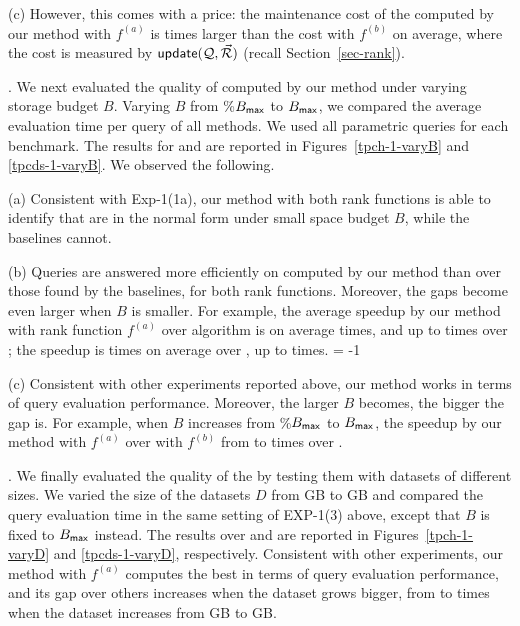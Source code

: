 \sstab (c) However, this comes with a price: the maintenance cost
of the \bdss computed by our method with $f^{(a)}$ is  times
larger than the cost with $f^{(b)}$ on average,
where the cost is measured by ${\mathsf{update}}(\mathcal Q, \vec{{\mathcal R}})$ (recall Section~\ref{sec-rank}). 


. We next evaluated the
quality of \bdss computed by our method under varying storage
budget $B$. Varying $B$ from \%$B_{\protect\mathsf{max}}$ to
$B_{\protect\mathsf{max}}$, we compared the average evaluation time per query
of all methods. We used all parametric queries for each
benchmark.
The results for \tpch and \tpcds are reported in
Figures~\ref{tpch-1-varyB} and \ref{tpcds-1-varyB}.
We observed the following.

\sstab (a) Consistent with Exp-1(1a), our method with both
rank functions is able to identify \bdss that
are in the normal form under small space budget $B$,
while the baselines cannot.

\sstab (b) Queries are answered more efficiently on \bdss
computed by our method than over those found by the baselines,
for both rank functions.
Moreover, the gaps become even larger when $B$ is
smaller. For example, the average speedup by our method with
rank function $f^{(a)}$ over algorithm \qcssel is on average 
times, and up to  times over \tpch; the speedup is %
 times
on average over \tpcds, up to  times.
\looseness = -1

\sstab (c) Consistent with other experiments reported
above, our method works 
in terms of query evaluation performance.
Moreover, the larger $B$ becomes, the bigger the gap is. 
For example, when $B$ increases from \%$B_{\protect\mathsf{max}}$ to
$B_{\protect\mathsf{max}}$, the speedup by
our method with $f^{(a)}$ over with $f^{(b)}$  from 
to  times over \tpch. 



.
We finally evaluated the quality of the \bdss by testing them
with datasets of different sizes. We
varied the size of the datasets $D$ from GB to GB and
compared the query evaluation time in the same setting
of EXP-1(3) above,
except that  $B$ is fixed to $B_{\protect\mathsf{max}}$ instead.
The results over \tpch and \tpcds are reported in
Figures~\ref{tpch-1-varyD} and \ref{tpcds-1-varyD}, respectively.
Consistent with other experiments, our method with $f^{(a)}$ computes the best
\bdss in terms of query evaluation performance, and its gap over
others increases when the dataset grows bigger, \eg
from  to  times when the \tpcds dataset increases from  GB to  GB.


